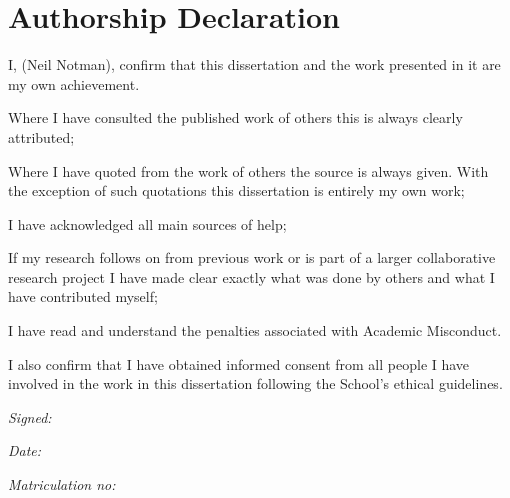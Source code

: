 
\section*{Authorship Declaration}
\vspace{0.5cm}
\begin{flushleft}
I, (Neil Notman), confirm that this dissertation and the work presented in it are my own achievement.\newline

Where I have consulted the published work of others this is always clearly attributed;\newline

Where I have quoted from the work of others the source is always given. With the exception of such quotations this dissertation is entirely my own work;\newline

I have acknowledged all main sources of help; \newline

If my research follows on from previous work or is part of a larger collaborative research project I have made clear exactly what was done by others and what I have contributed myself;\newline

I have read and understand the penalties associated with Academic Misconduct.\newline

I also confirm that I have obtained informed consent from all people I have involved in the work in this dissertation following the School's ethical guidelines.\newline
\end{flushleft}

\begin{flushleft} \large
\emph{Signed:} \\
\end{flushleft}

\vspace{.5cm}

\begin{flushleft} \large
\emph{Date:} \\
\end{flushleft}

\vspace{.5cm}

\begin{flushleft} \large
\emph{Matriculation no: }  \\
\end{flushleft}
